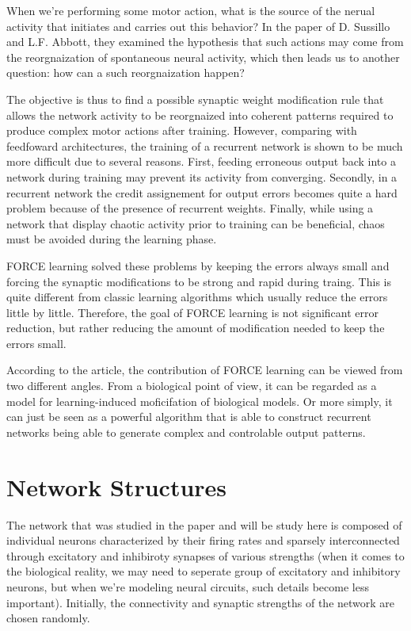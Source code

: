 When we're performing some motor action, what is the source of the nerual
activity that initiates and carries out this behavior? In the paper of
D. Sussillo and L.F. Abbott, they examined the hypothesis that such actions 
may come from the reorgnaization of spontaneous neural activity, which then
leads us to another question: how can a such reorgnaization happen?

The objective is thus to find a possible synaptic weight modification rule
that allows the network activity to be reorgnaized into coherent patterns 
required to produce complex motor actions after training. However, comparing
with feedfoward architectures, the training of a recurrent network is
shown to be much more difficult due to several reasons.
First, feeding erroneous output back into a network during training may
prevent its activity from converging. Secondly, in a recurrent network
the credit assignement for output errors becomes quite a hard problem because
of the presence of recurrent weights. Finally, while using a network that
display chaotic activity prior to training can be beneficial, chaos
must be avoided during the learning phase.

FORCE learning solved these problems by keeping the errors always small
and forcing the synaptic modifications to be strong and rapid during traing.
This is quite different from classic learning algorithms which usually
reduce the errors little by little. Therefore, the goal of FORCE learning
is not significant error reduction, but rather reducing the amount of
modification needed to keep the errors small.

According to the article, the contribution of FORCE learning can be
viewed from two different angles. From a biological point of view, it can
be regarded as a model for learning-induced moficifation of biological
models. Or more simply, it can just be seen as a powerful algorithm that
is able to construct recurrent networks being able to generate complex
and controlable output patterns.

\section{Network Structures}

The network that was studied in the paper and will be study here is composed
of individual neurons characterized by their firing rates and
sparsely interconnected through excitatory and inhibiroty synapses of 
various strengths (when it comes to the biological reality, we may need to
seperate group of excitatory and inhibitory neurons, but when we're modeling
neural circuits, such details become less important). Initially, the
connectivity and synaptic strengths of the network are chosen randomly.

